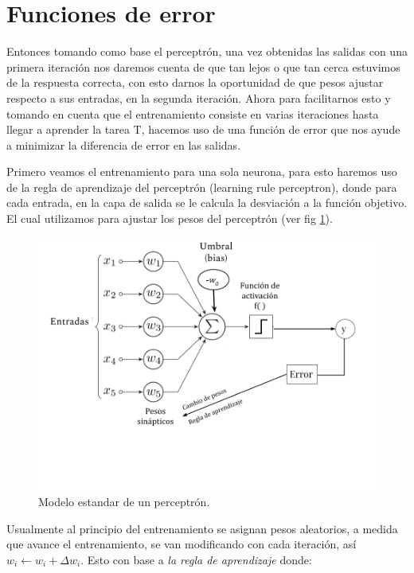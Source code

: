 \section{Funciones de error}

Entonces tomando como base el perceptrón, una vez obtenidas las salidas con una primera iteración nos daremos cuenta de que tan lejos o que tan cerca estuvimos de la respuesta correcta, con esto darnos la oportunidad de que pesos ajustar respecto a sus entradas, en la segunda iteración. Ahora para facilitarnos esto y tomando en cuenta que el entrenamiento consiste en varias iteraciones hasta llegar a aprender la tarea T, hacemos uso de una función de error que nos ayude a minimizar la diferencia de error en las salidas. 

Primero veamos el entrenamiento para una sola neurona, para esto haremos uso de la regla de aprendizaje del perceptrón (learning rule perceptron), donde para cada entrada, en la capa de salida se le calcula la desviación a la función objetivo. El cual utilizamos para ajustar los pesos del perceptrón (ver fig \ref{fig:errorP}). 

\begin{figure}[h]
 \centering
 \includegraphics[scale=0.5]{../Figuras/ErrorPerceptron.png}
 \caption{Modelo estandar de un perceptrón.}
 \label{fig:errorP}
\end{figure}

Usualmente al principio del entrenamiento se asignan pesos aleatorios, a medida que avance el entrenamiento, se van modificando con cada iteración, así \(w_{i} \leftarrow w_{i} + \Delta w_{i}\). Esto con base a \emph{la regla de aprendizaje} donde: 


